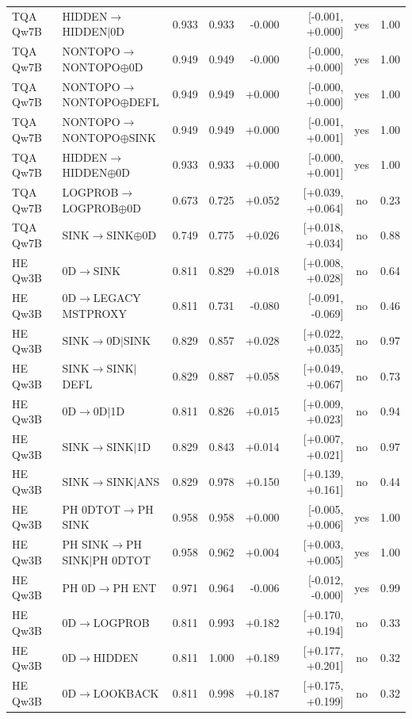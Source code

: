 \begin{longtable}{llrrrrcc}
TQA Qw7B & HIDDEN$\to$HIDDEN$\mid$0D & 0.933 & 0.933 & -0.000 & [-0.001, +0.000] & yes & 1.00 \\
TQA Qw7B & NONTOPO$\to$NONTOPO$\oplus$0D & 0.949 & 0.949 & -0.000 & [-0.000, +0.000] & yes & 1.00 \\
TQA Qw7B & NONTOPO$\to$NONTOPO$\oplus$DEFL & 0.949 & 0.949 & +0.000 & [-0.000, +0.000] & yes & 1.00 \\
TQA Qw7B & NONTOPO$\to$NONTOPO$\oplus$SINK & 0.949 & 0.949 & +0.000 & [-0.001, +0.001] & yes & 1.00 \\
TQA Qw7B & HIDDEN$\to$HIDDEN$\oplus$0D & 0.933 & 0.933 & +0.000 & [-0.000, +0.001] & yes & 1.00 \\
TQA Qw7B & LOGPROB$\to$LOGPROB$\oplus$0D & 0.673 & 0.725 & +0.052 & [+0.039, +0.064] & no & 0.23 \\
TQA Qw7B & SINK$\to$SINK$\oplus$0D & 0.749 & 0.775 & +0.026 & [+0.018, +0.034] & no & 0.88 \\
HE Qw3B & 0D$\to$SINK & 0.811 & 0.829 & +0.018 & [+0.008, +0.028] & no & 0.64 \\
HE Qw3B & 0D$\to$LEGACY MSTPROXY & 0.811 & 0.731 & -0.080 & [-0.091, -0.069] & no & 0.46 \\
HE Qw3B & SINK$\to$0D$\mid$SINK & 0.829 & 0.857 & +0.028 & [+0.022, +0.035] & no & 0.97 \\
HE Qw3B & SINK$\to$SINK$\mid$DEFL & 0.829 & 0.887 & +0.058 & [+0.049, +0.067] & no & 0.73 \\
HE Qw3B & 0D$\to$0D$\mid$1D & 0.811 & 0.826 & +0.015 & [+0.009, +0.023] & no & 0.94 \\
HE Qw3B & SINK$\to$SINK$\mid$1D & 0.829 & 0.843 & +0.014 & [+0.007, +0.021] & no & 0.97 \\
HE Qw3B & SINK$\to$SINK$\mid$ANS & 0.829 & 0.978 & +0.150 & [+0.139, +0.161] & no & 0.44 \\
HE Qw3B & PH 0DTOT$\to$PH SINK & 0.958 & 0.958 & +0.000 & [-0.005, +0.006] & yes & 1.00 \\
HE Qw3B & PH SINK$\to$PH SINK$\mid$PH 0DTOT & 0.958 & 0.962 & +0.004 & [+0.003, +0.005] & yes & 1.00 \\
HE Qw3B & PH 0D$\to$PH ENT & 0.971 & 0.964 & -0.006 & [-0.012, -0.000] & yes & 0.99 \\
HE Qw3B & 0D$\to$LOGPROB & 0.811 & 0.993 & +0.182 & [+0.170, +0.194] & no & 0.33 \\
HE Qw3B & 0D$\to$HIDDEN & 0.811 & 1.000 & +0.189 & [+0.177, +0.201] & no & 0.32 \\
HE Qw3B & 0D$\to$LOOKBACK & 0.811 & 0.998 & +0.187 & [+0.175, +0.199] & no & 0.32 \\

\end{longtable}
